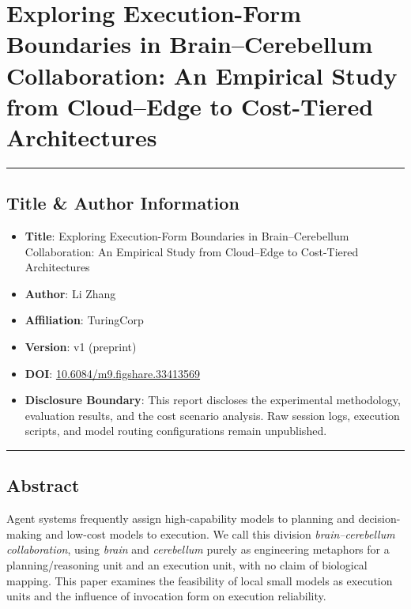 \documentclass[
]{article}
\providecommand{\tightlist}{%
  \setlength{\itemsep}{0pt}\setlength{\parskip}{0pt}}
\begin{document}
\section{Exploring Execution-Form Boundaries in Brain--Cerebellum Collaboration: An Empirical Study from Cloud--Edge to Cost-Tiered Architectures}\label{title}

\begin{center}\rule{0.5\linewidth}{0.5pt}\end{center}

\subsection{Title \& Author Information}\label{title-author-information}

\begin{itemize}
\tightlist
\item
  \textbf{Title}: Exploring Execution-Form Boundaries in Brain--Cerebellum Collaboration: An Empirical Study from Cloud--Edge to Cost-Tiered Architectures
\item
  \textbf{Author}: Li Zhang
\item
  \textbf{Affiliation}: TuringCorp
\item
  \textbf{Version}: v1 (preprint)
\item
  \textbf{DOI}: \href{https://doi.org/10.6084/m9.figshare.33413569}{10.6084/m9.figshare.33413569}
\item
  \textbf{Disclosure Boundary}: This report discloses the experimental methodology, evaluation results, and the cost scenario analysis. Raw session logs, execution scripts, and model routing configurations remain unpublished.
\end{itemize}

\begin{center}\rule{0.5\linewidth}{0.5pt}\end{center}

\subsection{Abstract}\label{abstract}



Agent systems frequently assign high-capability models to planning and decision-making and low-cost models to execution. We call this division \emph{brain--cerebellum collaboration}, using \emph{brain} and \emph{cerebellum} purely as engineering metaphors for a planning/reasoning unit and an execution unit, with no claim of biological mapping. This paper examines the feasibility of local small models as execution units and the influence of invocation form on execution reliability.
\end{document}
